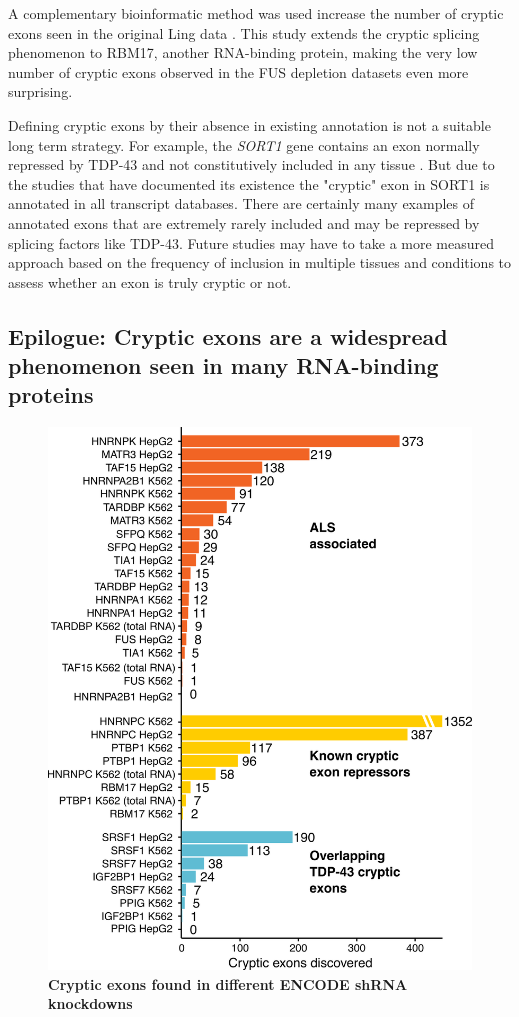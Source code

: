 A complementary bioinformatic method was used increase the number of cryptic exons seen in the original Ling data \citep{Tan07102016}. This study extends the cryptic splicing phenomenon to RBM17, another RNA-binding protein, making the very low number of cryptic exons observed in the FUS depletion datasets even more surprising.

Defining cryptic exons by their absence in existing annotation is not a suitable long term strategy. For example, the \textit{SORT1} gene contains an exon normally repressed by TDP-43 and not constitutively included in any tissue \citep{Prudencio2012}. But due to the studies that have documented its existence the "cryptic" exon in SORT1 is annotated in all transcript databases. There are certainly many examples of annotated exons that are extremely rarely included and may be repressed by splicing factors like TDP-43. Future studies may have to take a more measured approach based on the frequency of inclusion in multiple tissues and conditions to assess whether an exon is truly cryptic or not.


\subsection{Epilogue: Cryptic exons are a widespread phenomenon seen in many RNA-binding proteins}

\begin{figure}[h!]
	\centering
	\includegraphics[width=\textwidth]{Figures/03_cryptic_exons/all_ENCODE_cryptex_counts.png}
	\caption{\textbf{Cryptic exons found in different ENCODE shRNA knockdowns}}
	\label{fig:cryptic_counts}
\end{figure}

